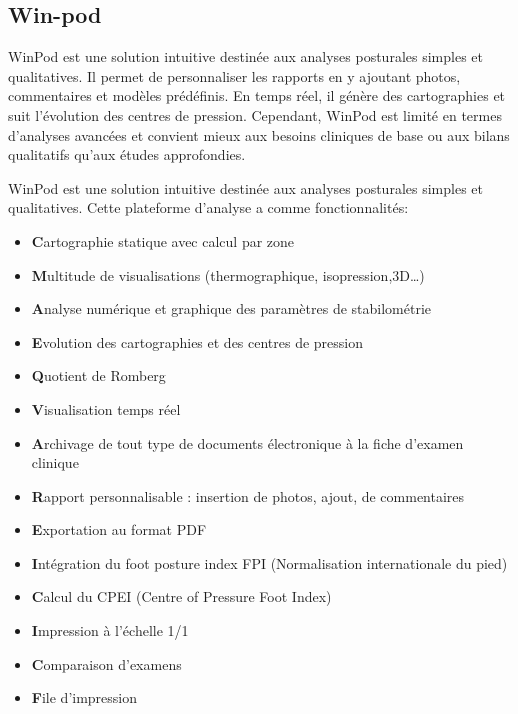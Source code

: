 \subsection{Win-pod}

WinPod est une solution intuitive destinée aux analyses posturales simples 
et qualitatives. Il permet de personnaliser les rapports en y ajoutant photos, 
commentaires et modèles prédéfinis. En temps réel, il génère des cartographies et
 suit l’évolution des centres de pression. Cependant, WinPod est limité en termes 
 d’analyses avancées et convient mieux aux besoins cliniques de base ou aux bilans 
 qualitatifs qu’aux études approfondies.

 WinPod est une solution intuitive destinée aux analyses posturales 
 simples et qualitatives. Cette plateforme d’analyse a comme fonctionnalités:

\begin{itemize}
    \item \textbf Cartographie statique avec calcul par zone
    \item \textbf Multitude de visualisations (thermographique, isopression,3D…)
    \item \textbf Analyse numérique et graphique des paramètres de stabilométrie
    \item \textbf Evolution des cartographies et des centres de pression
    \item \textbf Quotient de Romberg
    \item \textbf Visualisation temps réel
    \item \textbf Archivage de tout type de documents électronique à la fiche d’examen clinique
    \item \textbf Rapport personnalisable : insertion de photos, ajout, de commentaires
    \item \textbf Exportation au format PDF
    \item \textbf Intégration du foot posture index FPI (Normalisation internationale du pied)
    \item \textbf Calcul du CPEI (Centre of Pressure Foot Index)
    \item \textbf Impression à l'échelle 1/1
    \item \textbf Comparaison d’examens
    \item \textbf File d’impression

\end{itemize}

